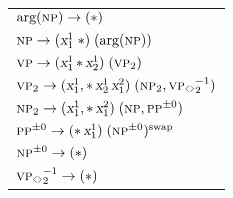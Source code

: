 \documentclass[../../../../document.tex]{subfiles}
\begin{document}
    \begin{tabular}{l}
        \(\text{arg}(\textsc{np}) \to ({\ast{}}{})\) \\[1mm]
        \(\textsc{np} \to (\textsl{x}_1^1\;{\ast{}}{})\;(\text{arg}(\textsc{np}))\)\\[1mm]
        \(\textsc{vp} \to (\textsl{x}^1_1\,{\ast{}}{}\,\textsl{x}^1_2)\;(\textsc{vp}_2)\) \\[1mm]
        \(\cn{vp}_2 \to (\x^1_1, \wildcard{}\,\x^1_2\,\x^2_1)\;(\cn{np}_2, \cn{vp\binsym{}}_2^{-1})\)\\[1mm]
        \(\textsc{np}_2 \to (\textsl{x}_1^1, {\ast{}}{}\,\textsl{x}^2_1)\;(\textsc{np}, \textsc{pp}^{\pm 0})\)\\[1mm]
        \(\textsc{pp}^{\pm 0} \to ({\ast{}}{}\,\textsl{x}^1_1)\;(\textsc{np}^{\pm 0})^{\mathrm{swap}}\)\\[1mm]
        \(\textsc{np}^{\pm 0} \to ({\ast{}}{})\)\\[1mm]
        \(\cn{vp\binsym{}}_2^{-1} \to (\wildcard{})\)
    \end{tabular}
\end{document}
